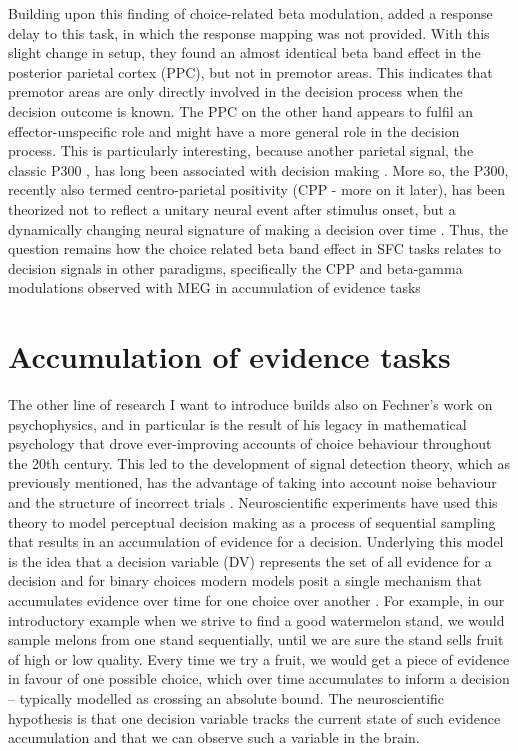 Building upon this finding of choice-related beta modulation, \textcite{Ludwig2018} added a response delay to this task, in which the response mapping was not provided. With this slight change in setup, they found an almost identical beta band effect in the posterior parietal cortex (PPC), but not in premotor areas. This indicates that premotor areas are only directly involved in the decision process when the decision outcome is known. The PPC on the other hand appears to fulfil an effector-unspecific role and might have a more general role in the decision process. This is particularly interesting, because another parietal signal, the classic P300 \parencite{Chapman1964,Sutton1965}, has long been associated with decision making \parencite{Donchin1967,Rohrbaugh1974}. More so, the P300, recently also termed centro-parietal positivity (CPP - more on it later), has been theorized not to reflect a unitary neural event after stimulus onset, but a dynamically changing neural signature of making a decision over time \parencite{Twomey2015}.  Thus, the question remains how the choice related beta band effect in SFC tasks relates to decision signals in other paradigms, specifically the CPP and beta-gamma modulations observed with MEG in accumulation of evidence tasks \parencite{Donner2009,Donner2007,Kelly2013,Kelly2015,OConnell2012,Twomey2016,Twomey2015,Philiastides2014}
\section{Accumulation of evidence tasks}
The other line of research I want to introduce builds also on Fechner’s work on psychophysics, and in particular is the result of his legacy in mathematical psychology that drove ever-improving accounts of choice behaviour throughout the 20th century. This led to the development of signal detection theory, which as previously mentioned, has the advantage of taking into account noise behaviour and the structure of incorrect trials \parencite{Tanner1954}. Neuroscientific experiments have used this theory to model perceptual decision making as a process of sequential sampling that results in an accumulation of evidence for a decision. Underlying this model is the idea that a decision variable (DV) represents the set of all evidence for a decision and for binary choices modern models posit a single mechanism that accumulates evidence over time for one choice over another \parencite{Shadlen2013}. For example, in our introductory example when we strive to find a good watermelon stand, we would sample melons from one stand sequentially, until we are sure the stand sells fruit of high or low quality. Every time we try a fruit, we would get a piece of evidence in favour of one possible choice, which over time accumulates to inform a decision – typically modelled as crossing an absolute bound. The neuroscientific hypothesis is that one decision variable tracks the current state of such evidence accumulation and that we can observe such a variable in the brain. 

